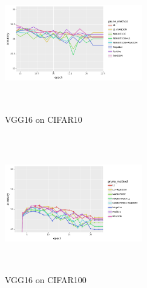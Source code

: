 \documentclass[11pt]{article}
\begin{document}
\begin{figure}[H]
\centering
\includegraphics[width=6cm, height=6cm]{Paper/images/vgg16cifar10.png}
\caption{VGG16 on CIFAR10}
\end{figure}
\begin{figure}[H]
\centering
\includegraphics[width=6cm, height=6cm]{Paper/images/vgg16cifar100.png}
\caption{VGG16 on CIFAR100}
\end{figure}
\end{document}
